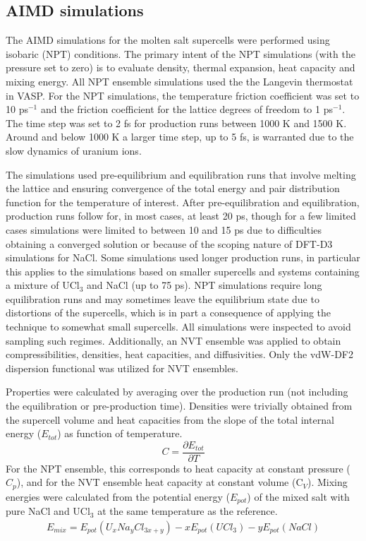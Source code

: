 \documentclass[preprint,3p,10pt,onecolumn,number,sort&compress]{elsarticle}
\begin{document}
{\subsection{AIMD simulations}
The AIMD simulations for the molten salt supercells were performed using isobaric (NPT) conditions. The primary intent of the NPT simulations (with the pressure set to zero) is to evaluate density, thermal expansion, heat capacity and mixing energy. All NPT ensemble simulations used the the Langevin thermostat in VASP. For the NPT simulations, the temperature friction coefficient was set to 10 ps$^{-1}$ and the friction coefficient for the lattice degrees of freedom to 1 ps$^{-1}$. The time step was set to 2 fs for production runs between 1000 K and 1500 K. Around and below 1000 K a larger time step, up to 5 fs, is warranted due to the slow dynamics of uranium ions.

The simulations used pre-equilibrium and equilibration runs that involve melting the lattice and ensuring convergence of the total energy and pair distribution function for the temperature of interest. After pre-equilibration and equilibration, production runs follow for, in most cases, at least 20 ps, though for a few limited cases simulations were limited to between 10 and 15 ps due to difficulties obtaining a converged solution or because of the scoping nature of DFT-D3 simulations for NaCl. Some simulations used longer production runs, in particular this applies to the simulations based on smaller supercells and systems containing a mixture of UCl$_3$ and NaCl (up to 75 ps). NPT simulations require long equilibration runs and may sometimes leave the equilibrium state due to distortions of the supercells, which is in part a consequence of applying the technique to somewhat small supercells. All simulations were inspected to avoid sampling such regimes. Additionally, an NVT ensemble was applied to obtain compressibilities, densities, heat capacities, and diffusivities. Only the vdW-DF2 dispersion functional was utilized for NVT ensembles. 

Properties were calculated by averaging over the production run (not including the equilibration or pre-production time). Densities were trivially obtained from the supercell volume and heat capacities from the slope of the total internal energy ($E_{tot}$) as function of temperature. 
\begin{equation}
\label{eq:cp}
C=\frac{\partial E_{tot}}{\partial T}
\end{equation}
For the NPT ensemble, this corresponds to heat capacity at constant pressure ($C_p$), and for the NVT ensemble heat capacity at constant volume (C$_V$). Mixing energies were calculated from the potential energy ($E_{pot}$) of the mixed salt with pure NaCl and UCl$_3$ at the same temperature as the reference. 
\begin{equation}
\begin{split}
E_{mix}=E_{pot}(U_xNa_yCl_{3x+y})-xE_{pot}(UCl_3)-yE_{pot}(NaCl)
\end{split}
\end{equation}

}
\end{document}
